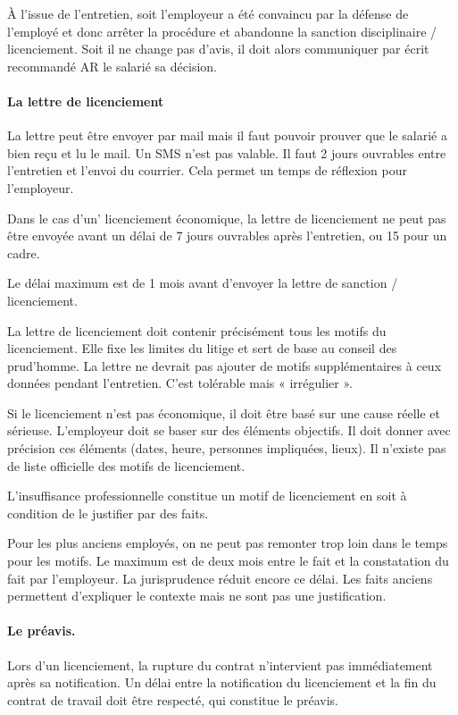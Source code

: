 À l’issue de l’entretien, soit l’employeur a été convaincu par la défense de l’employé et donc arrêter la procédure et abandonne la sanction disciplinaire / licenciement.
Soit il ne change pas d’avis, il doit alors communiquer par écrit recommandé AR le salarié sa décision.


\paragraph{La lettre de licenciement}

La lettre peut être envoyer par mail mais il faut pouvoir prouver que le salarié a bien reçu et lu le mail.
Un SMS n'est pas valable.
Il faut 2 jours ouvrables entre l’entretien et l’envoi du courrier.
Cela permet un temps de réflexion pour l’employeur.

Dans le cas d'un' licenciement économique, la lettre de licenciement ne peut pas être envoyée avant un délai de 7 jours ouvrables après l’entretien, ou 15 pour un cadre.

Le délai maximum est de 1 mois avant d’envoyer la lettre de sanction / licenciement.

La lettre de licenciement doit contenir précisément tous les motifs du licenciement.
Elle fixe les limites du litige et sert de base au conseil des prud’homme.
La lettre ne devrait pas ajouter de motifs supplémentaires à ceux données pendant l’entretien.
C’est tolérable mais « irrégulier ».

Si le licenciement n’est pas économique, il doit être basé sur une cause réelle et sérieuse.
L’employeur doit se baser sur des éléments objectifs.
Il doit donner avec précision ces éléments (dates, heure, personnes impliquées, lieux).
Il n’existe pas de liste officielle des motifs de licenciement.

L’insuffisance professionnelle constitue un motif de licenciement en soit à condition de le justifier par des faits.

Pour les plus anciens employés, on ne peut pas remonter trop loin dans le temps pour les motifs.
Le maximum est de deux mois entre le fait et la constatation du fait par l’employeur.
La jurisprudence réduit encore ce délai.
Les faits anciens permettent d'expliquer le contexte mais ne sont pas une justification.


\paragraph{Le préavis.}
Lors d'un licenciement, la rupture du contrat n'intervient pas immédiatement après sa notification.
Un délai entre la notification du licenciement et la fin du contrat de travail doit être respecté, qui constitue le préavis.

